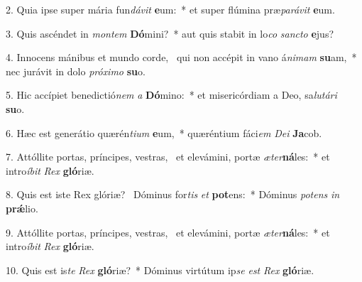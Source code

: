 2. Quia ipse super mária fun\textit{dá}\textit{vit} \textbf{e}um:~*  et super flúmina præ\textit{pa}\textit{rá}\textit{vit} \textbf{e}um.\

3. Quis ascéndet in \textit{mon}\textit{tem} \textbf{Dó}mini?~*  aut quis stabit in lo\textit{co} \textit{sanc}\textit{to} \textbf{e}jus?\

4. Innocens mánibus et mundo corde, \dag\  qui non accépit in vano á\textit{ni}\textit{mam} \textbf{su}am,~*  nec jurávit in dolo \textit{pró}\textit{xi}\textit{mo} \textbf{su}o.\

5. Hic accípiet benedictió\textit{nem} \textit{a} \textbf{Dó}mino:~*  et misericórdiam a Deo, sa\textit{lu}\textit{tá}\textit{ri} \textbf{su}o.\

6. Hæc est generátio quærén\textit{ti}\textit{um} \textbf{e}um,~*  quæréntium fáci\textit{em} \textit{De}\textit{i} \textbf{Ja}cob.\

7. Attóllite portas, príncipes, vestras, \dag\  et elevámini, portæ \textit{æ}\textit{ter}\textbf{ná}les:~*  et intro\textit{í}\textit{bit} \textit{Rex} \textbf{gló}riæ.\

8. Quis est iste Rex glóriæ? \dag\  Dóminus for\textit{tis} \textit{et} \textbf{pot}ens:~*  Dóminus \textit{pot}\textit{ens} \textit{in} \textbf{prǽ}lio.\

9. Attóllite portas, príncipes, vestras, \dag\  et elevámini, portæ \textit{æ}\textit{ter}\textbf{ná}les:~*  et intro\textit{í}\textit{bit} \textit{Rex} \textbf{gló}riæ.\

10. Quis est is\textit{te} \textit{Rex} \textbf{gló}riæ?~*  Dóminus virtútum ip\textit{se} \textit{est} \textit{Rex} \textbf{gló}riæ.\

